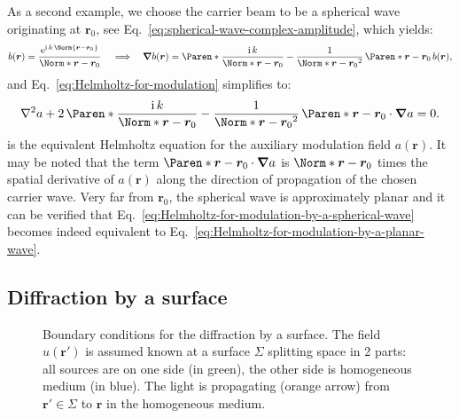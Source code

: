 \documentclass[a4paper]{article}
\newcommand*{\V}[1]{\boldsymbol{#1}}
\newcommand*{\mathe}{\mathrm{e}}
\newcommand*{\mathi}{\mathrm{i}}
\begin{document}
As a second example, we choose the carrier beam to be a spherical wave originating at
$\V{r}_{0}$, see Eq.~\eqref{eq:spherical-wave-complex-amplitude}, which yields:
\begin{equation}
  b(\V{r}) = \frac{\mathe^{\mathi\,k\,\Norm{\V{r} - \V{r}_{0}}}}{\Norm*{\V{r} - \V{r}_{0}}}\,
  \quad\Longrightarrow\quad
  \V{\nabla}b(\V{r}) = \Paren*{
    \frac{\mathi\,k}{\Norm*{\V{r} - \V{r}_{0}}}
    - \frac{1}{\Norm*{\V{r} - \V{r}_{0}}^{2}}
  }\,\Paren*{\V{r} - \V{r}_{0}}\,b(\V{r}),
\end{equation}
and Eq.~\eqref{eq:Helmholtz-for-modulation} simplifies to:
\begin{equation}
  \label{eq:Helmholtz-for-modulation-by-a-spherical-wave}
  \nabla^{2}a + 2\,\Paren*{
    \frac{\mathi\,k}{\Norm*{\V{r} - \V{r}_{0}}}
    - \frac{1}{\Norm*{\V{r} - \V{r}_{0}}^{2}}
  }\,\Paren*{\V{r} - \V{r}_{0}}\cdot\V{\nabla}a = 0.
\end{equation}
is the equivalent Helmholtz equation for the auxiliary modulation field $a(\V{r})$. It may
be noted that the term $\Paren*{\V{r} - \V{r}_{0}}\cdot\V{\nabla}a$ is
$\Norm*{\V{r} - \V{r}_{0}}$ times the spatial derivative of $a(\V{r})$ along the direction
of propagation of the chosen carrier wave. Very far from $\V{r}_{0}$, the spherical wave
is approximately planar and it can be verified that
Eq.~\eqref{eq:Helmholtz-for-modulation-by-a-spherical-wave} becomes indeed equivalent to
Eq.~\eqref{eq:Helmholtz-for-modulation-by-a-planar-wave}.


\subsection{Diffraction by a surface}

\begin{figure}
  \centering
  \caption{Boundary conditions for the diffraction by a surface. The field
    $u(\V{r}')$ is assumed known at a surface $Σ$ splitting space in 2 parts:
    all sources are on one side (in green), the other side is homogeneous
    medium (in blue). The light is propagating (orange arrow) from
    $\V{r}' ∈ Σ$ to $\V{r}$ in the homogeneous medium.}
  \label{fig:boundary-conditions}
\end{figure}
\end{document}

